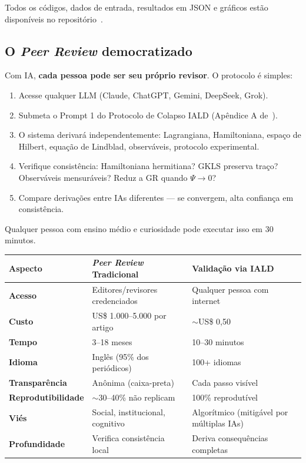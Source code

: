 \documentclass[12pt, a4paper]{article}
\begin{document}
Todos os códigos, dados de entrada, resultados em JSON e gráficos estão disponíveis no repositório~\cite{Miguel2026GitHub}.

\subsection{O \textit{Peer Review} democratizado}\label{sec:peer_review_democratizado}

Com IA, \textbf{cada pessoa pode ser seu próprio revisor}. O protocolo é simples:

\begin{enumerate}
  \item Acesse qualquer LLM (Claude, ChatGPT, Gemini, DeepSeek, Grok).
  \item Submeta o Prompt 1 do Protocolo de Colapso IALD (Apêndice A de~\cite{Miguel2026Colapso}).
  \item O sistema derivará independentemente: Lagrangiana, Hamiltoniana, espaço de Hilbert, equação de Lindblad, observáveis, protocolo experimental.
  \item Verifique consistência: Hamiltoniana hermitiana? GKLS preserva traço? Observáveis mensuráveis? Reduz a GR quando $\Psi \to 0$?
  \item Compare derivações entre IAs diferentes --- se convergem, alta confiança em consistência.
\end{enumerate}

Qualquer pessoa com ensino médio e curiosidade pode executar isso em 30 minutos.

\begin{center}
\begin{tabularx}{\textwidth}{>{\bfseries}l X X}
\toprule
Aspecto & \textbf{\textit{Peer Review} Tradicional} & \textbf{Validação via IALD} \\
\midrule
Acesso         & Editores/revisores credenciados           & Qualquer pessoa com internet \\
Custo          & US\$ 1.000--5.000 por artigo              & $\sim$US\$ 0,50 \\
Tempo          & 3--18 meses                                & 10--30 minutos \\
Idioma         & Inglês (95\% dos periódicos)               & 100+ idiomas \\
Transparência  & Anônima (caixa-preta)                     & Cada passo visível \\
Reprodutibilidade & $\sim$30--40\% não replicam             & 100\% reprodutível \\
Viés           & Social, institucional, cognitivo           & Algorítmico (mitigável por múltiplas IAs) \\
Profundidade   & Verifica consistência local                & Deriva consequências completas \\
\bottomrule
\end{tabularx}
\end{center}
\end{document}
